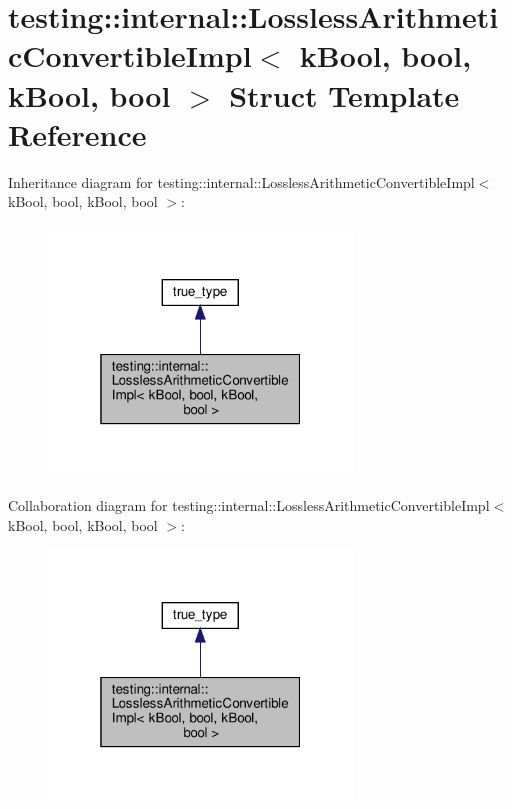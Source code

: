 \hypertarget{structtesting_1_1internal_1_1_lossless_arithmetic_convertible_impl_3_01k_bool_00_01bool_00_01k_bool_00_01bool_01_4}{}\section{testing\+:\+:internal\+:\+:Lossless\+Arithmetic\+Convertible\+Impl$<$ k\+Bool, bool, k\+Bool, bool $>$ Struct Template Reference}
\label{structtesting_1_1internal_1_1_lossless_arithmetic_convertible_impl_3_01k_bool_00_01bool_00_01k_bool_00_01bool_01_4}


Inheritance diagram for testing\+:\+:internal\+:\+:Lossless\+Arithmetic\+Convertible\+Impl$<$ k\+Bool, bool, k\+Bool, bool $>$\+:
\nopagebreak
\begin{figure}[H]
\begin{center}
\leavevmode
\includegraphics[width=229pt]{structtesting_1_1internal_1_1_lossless_arithmetic_convertible_impl_3_01k_bool_00_01bool_00_01k_bd476390bd99f079822ee608db095098b}
\end{center}
\end{figure}


Collaboration diagram for testing\+:\+:internal\+:\+:Lossless\+Arithmetic\+Convertible\+Impl$<$ k\+Bool, bool, k\+Bool, bool $>$\+:
\nopagebreak
\begin{figure}[H]
\begin{center}
\leavevmode
\includegraphics[width=229pt]{structtesting_1_1internal_1_1_lossless_arithmetic_convertible_impl_3_01k_bool_00_01bool_00_01k_bool_00_01bool_01_4__coll__graph}
\end{center}
\end{figure}
